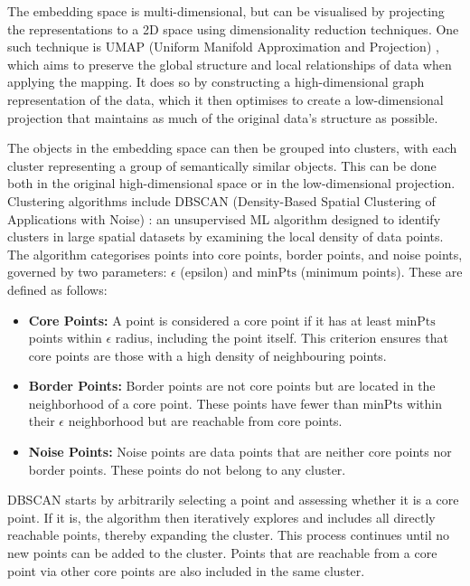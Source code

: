 \documentclass[a4paper,12pt]{article}
\begin{document}
 The embedding space is multi-dimensional, but can be visualised by projecting the representations to a 2D space using dimensionality reduction techniques. One such technique is UMAP (Uniform Manifold Approximation and Projection) \cite{UMAP}, which aims to preserve the global structure and local relationships of data when applying the mapping. It does so by constructing a high-dimensional graph representation of the data, which it then optimises to create a low-dimensional projection that maintains as much of the original data's structure as possible.

 The objects in the embedding space can then be grouped into clusters, with each cluster representing a group of semantically similar objects. This can be done both in the original high-dimensional space or in the low-dimensional projection. Clustering algorithms include DBSCAN (Density-Based Spatial Clustering of Applications with Noise) \cite{dbscan}: an unsupervised ML algorithm designed to identify clusters in large spatial datasets by examining the local density of data points. The algorithm categorises points into core points, border points, and noise points, governed by two parameters: $\epsilon$ (epsilon) and $\text{minPts}$ (minimum points). These are defined as follows:
 \begin{itemize}
     \item \textbf{Core Points:} A point is considered a core point if it has at least $\text{minPts}$ points within $\epsilon$ radius, including the point itself. This criterion ensures that core points are those with a high density of neighbouring points.
 
     \item \textbf{Border Points:} Border points are not core points but are located in the neighborhood of a core point. These points have fewer than $\text{minPts}$ within their $\epsilon$ neighborhood but are reachable from core points.
 
     \item \textbf{Noise Points:} Noise points are data points that are neither core points nor border points. These points do not belong to any cluster.
 \end{itemize}
 DBSCAN starts by arbitrarily selecting a point and assessing whether it is a core point. If it is, the algorithm then iteratively explores and includes all directly reachable points, thereby expanding the cluster. This process continues until no new points can be added to the cluster. Points that are reachable from a core point via other core points are also included in the same cluster.
\end{document}
